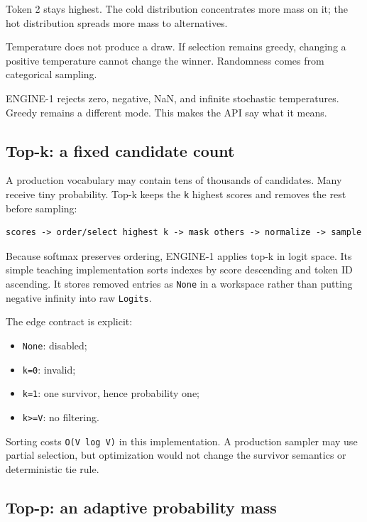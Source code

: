 \documentclass[
  10pt,
]{article}
\providecommand{\tightlist}{%
  \setlength{\itemsep}{0pt}\setlength{\parskip}{0pt}}
\begin{document}
Token 2 stays highest. The cold distribution concentrates more mass on
it; the hot distribution spreads more mass to alternatives.

Temperature does not produce a draw. If selection remains greedy,
changing a positive temperature cannot change the winner. Randomness
comes from categorical sampling.

ENGINE-1 rejects zero, negative, NaN, and infinite stochastic
temperatures. Greedy remains a different mode. This makes the API say
what it means.

\subsection{Top-k: a fixed candidate
count}\label{top-k-a-fixed-candidate-count}

A production vocabulary may contain tens of thousands of candidates.
Many receive tiny probability. Top-k keeps the \texttt{k} highest scores
and removes the rest before sampling:

\begin{verbatim}
scores -> order/select highest k -> mask others -> normalize -> sample
\end{verbatim}

Because softmax preserves ordering, ENGINE-1 applies top-k in logit
space. Its simple teaching implementation sorts indexes by score
descending and token ID ascending. It stores removed entries as
\texttt{None} in a workspace rather than putting negative infinity into
raw \texttt{Logits}.

The edge contract is explicit:

\begin{itemize}
\tightlist
\item
  \texttt{None}: disabled;
\item
  \texttt{k=0}: invalid;
\item
  \texttt{k=1}: one survivor, hence probability one;
\item
  \texttt{k\textgreater{}=V}: no filtering.
\end{itemize}

Sorting costs \texttt{O(V\ log\ V)} in this implementation. A production
sampler may use partial selection, but optimization would not change the
survivor semantics or deterministic tie rule.

\subsection{Top-p: an adaptive probability
mass}\label{top-p-an-adaptive-probability-mass}
\end{document}
